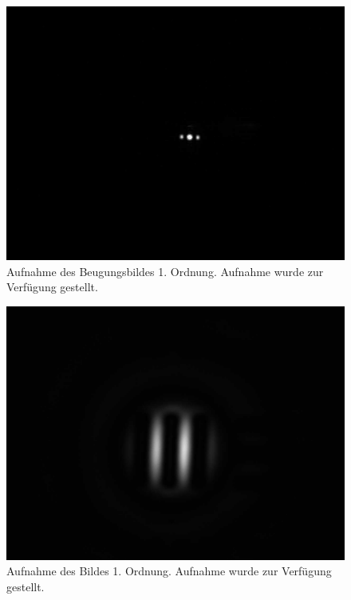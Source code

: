 \documentclass{article}
\begin{document}
\begin{minipage}[t]{.45\textwidth}
\begin{figure}[H]
\includegraphics[scale=0.1]{jw/L_BB_4.jpg}
\caption{Aufnahme des Beugungsbildes 1. Ordnung. Aufnahme wurde zur Verfügung gestellt.}
\label{fig:bbild_1_jw}
\end{figure}
\end{minipage}
\hfill
\noindent
\begin{minipage}[t]{.45\textwidth}
\begin{figure}[H]
\includegraphics[scale=0.1]{jw/L_OB_4.jpg}
\caption{Aufnahme des Bildes 1. Ordnung. Aufnahme wurde zur Verfügung gestellt.}\label{fig:bild_1_jw}
\end{figure}
\end{minipage}
\end{document}
